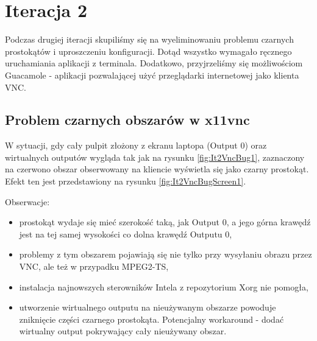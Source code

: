 \section{Iteracja 2}

  Podczas drugiej iteracji skupiliśmy się na wyeliminowaniu problemu czarnych prostokątów i uproszczeniu konfiguracji. Dotąd wszystko wymagało ręcznego uruchamiania aplikacji z terminala. Dodatkowo, przyjrzeliśmy się możliwościom Guacamole - aplikacji pozwalającej użyć przeglądarki internetowej jako klienta VNC.

  \subsection{Problem czarnych obszarów w x11vnc}

    W sytuacji, gdy cały pulpit złożony z ekranu laptopa (Output 0) oraz wirtualnych outputów wygląda tak jak na rysunku \ref{fig:It2VncBug1}, zaznaczony na czerwono obszar obserwowany na kliencie wyświetla się jako czarny prostokąt. Efekt ten jest przedstawiony na rysunku \ref{fig:It2VncBugScreen1}.

    \vfill

    Obserwacje:
    \begin{itemize}
      \item prostokąt wydaje się mieć szerokość taką, jak Output 0, a jego górna krawędź jest na tej samej wysokości co dolna krawędź Outputu 0,
      \item problemy z tym obszarem pojawiają się nie tylko przy wysyłaniu obrazu przez VNC, ale też w przypadku MPEG2-TS,
      \item instalacja najnowszych sterowników Intela z repozytorium Xorg nie pomogła,
      \item utworzenie wirtualnego outputu na nieużywanym obszarze powoduje zniknięcie części czarnego prostokąta. Potencjalny workaround - dodać wirtualny output pokrywający cały nieużywany obszar.
    \end{itemize}
    \vfill

